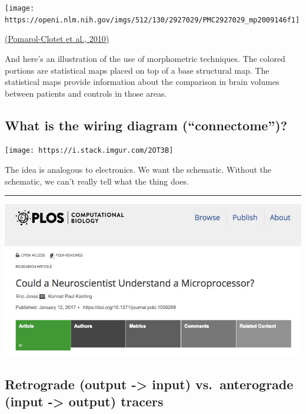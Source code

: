\documentclass[]{article}
\begin{document}
\begin{center}\texttt{[image: https://openi.nlm.nih.gov/imgs/512/130/2927029/PMC2927029\_mp2009146f1]} \end{center}

\href{https://dx.doi.org/10.1038/mp.2009.146}{(Pomarol-Clotet et al.,
2010)}

And here's an illustration of the use of morphometric techniques. The
colored portions are statistical maps placed on top of a base structural
map. The statistical maps provide information about the comparison in
brain volumes between patients and controls in those areas.

\hypertarget{what-is-the-wiring-diagram-connectome}{%
\subsection{What is the wiring diagram
(``connectome'')?}\label{what-is-the-wiring-diagram-connectome}}

\begin{center}\texttt{[image: https://i.stack.imgur.com/2OT3B]} \end{center}

The idea is analogous to electronics. We want the schematic. Without the
schematic, we can't really tell what the thing does.

\begin{center}\rule{0.5\linewidth}{\linethickness}\end{center}

\begin{center}\includegraphics[width=800px]{img/jonas-kording-2017} \end{center}

\hypertarget{retrograde-output---input-vs.anterograde-input---output-tracers}{%
\subsection{Retrograde (output -\textgreater{} input) vs.~anterograde
(input -\textgreater{} output)
tracers}\label{retrograde-output---input-vs.anterograde-input---output-tracers}}
\end{document}
